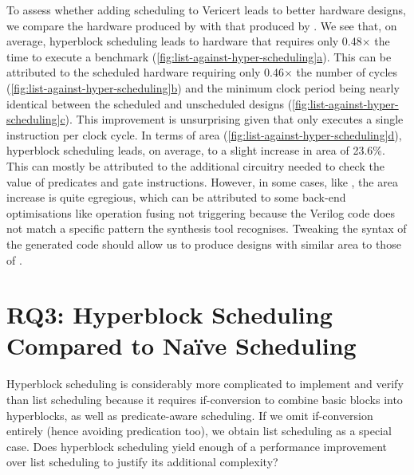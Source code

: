 To assess whether adding scheduling to Vericert leads to better hardware designs, we compare the hardware produced by \VericertBase{} with that produced by \VericertHyper{}. We see that, on average, hyperblock scheduling leads to hardware that requires only 0.48$\times$ the time to execute a benchmark (\cref{fig:list-against-hyper-scheduling}\hyperref[fig:list-against-hyper-scheduling]{a}).  This can be attributed to the scheduled hardware requiring only 0.46$\times$ the number of cycles (\cref{fig:list-against-hyper-scheduling}\hyperref[fig:list-against-hyper-scheduling]{b}) and the minimum clock period being nearly identical between the scheduled and unscheduled designs (\cref{fig:list-against-hyper-scheduling}\hyperref[fig:list-against-hyper-scheduling]{c}). This improvement is unsurprising given that \VericertBase{} only executes a single instruction per clock cycle. In terms of area (\cref{fig:list-against-hyper-scheduling}\hyperref[fig:list-against-hyper-scheduling]{d}), hyperblock scheduling leads, on average, to a slight increase in area of 23.6\%.  This can mostly be attributed to the additional circuitry needed to check the value of predicates and gate instructions. However, in some cases, like , the area increase is quite egregious, which can be attributed to some back-end optimisations like operation fusing not triggering because the Verilog code does not match a specific pattern the synthesis tool recognises. Tweaking the syntax of the generated code should allow us to produce designs with similar area to those of \VericertBase{}.

\section{RQ3: Hyperblock Scheduling Compared to Na\"ive Scheduling}

Hyperblock scheduling is considerably more complicated to implement and verify than list scheduling because it requires \gls{if-conversion} to combine basic blocks into hyperblocks, as well as predicate-aware scheduling. If we omit if-conversion entirely (hence avoiding predication too), we obtain list scheduling as a special case. Does hyperblock scheduling yield enough of a performance improvement over list scheduling to justify its additional complexity?

